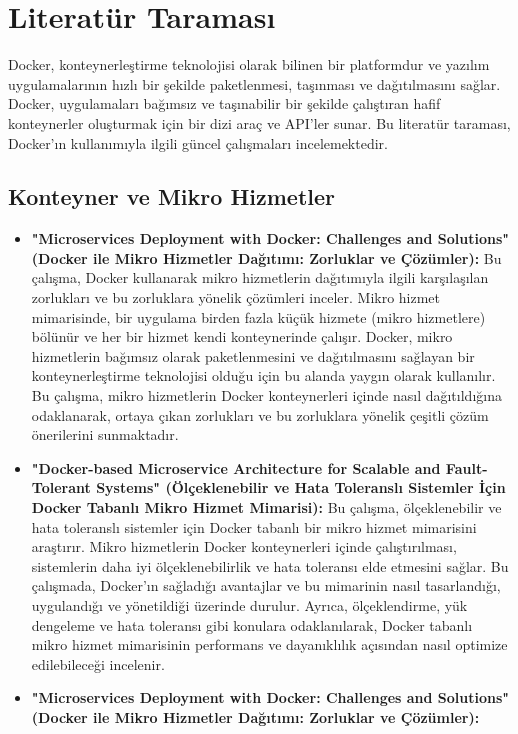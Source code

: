 \section{Literatür Taraması}
Docker, konteynerleştirme teknolojisi olarak bilinen bir platformdur ve yazılım uygulamalarının hızlı bir şekilde paketlenmesi, taşınması ve dağıtılmasını sağlar. Docker, uygulamaları bağımsız ve taşınabilir bir şekilde çalıştıran hafif konteynerler oluşturmak için bir dizi araç ve API'ler sunar. Bu literatür taraması, Docker'ın kullanımıyla ilgili güncel çalışmaları incelemektedir.\\
\subsection{Konteyner ve Mikro Hizmetler}
\begin{itemize}
\item  \textbf{"Microservices Deployment with Docker: Challenges and Solutions" (Docker ile Mikro Hizmetler Dağıtımı: Zorluklar ve Çözümler):}
Bu çalışma, Docker kullanarak mikro hizmetlerin dağıtımıyla ilgili karşılaşılan zorlukları ve bu zorluklara yönelik çözümleri inceler. Mikro hizmet mimarisinde, bir uygulama birden fazla küçük hizmete (mikro hizmetlere) bölünür ve her bir hizmet kendi konteynerinde çalışır. Docker, mikro hizmetlerin bağımsız olarak paketlenmesini ve dağıtılmasını sağlayan bir konteynerleştirme teknolojisi olduğu için bu alanda yaygın olarak kullanılır. Bu çalışma, mikro hizmetlerin Docker konteynerleri içinde nasıl dağıtıldığına odaklanarak, ortaya çıkan zorlukları ve bu zorluklara yönelik çeşitli çözüm önerilerini sunmaktadır.\\
\item \textbf{"Docker-based Microservice Architecture for Scalable and Fault-Tolerant Systems" (Ölçeklenebilir ve Hata Toleranslı Sistemler İçin Docker Tabanlı Mikro Hizmet Mimarisi):}
Bu çalışma, ölçeklenebilir ve hata toleranslı sistemler için Docker tabanlı bir mikro hizmet mimarisini araştırır. Mikro hizmetlerin Docker konteynerleri içinde çalıştırılması, sistemlerin daha iyi ölçeklenebilirlik ve hata toleransı elde etmesini sağlar. Bu çalışmada, Docker'ın sağladığı avantajlar ve bu mimarinin nasıl tasarlandığı, uygulandığı ve yönetildiği üzerinde durulur. Ayrıca, ölçeklendirme, yük dengeleme ve hata toleransı gibi konulara odaklanılarak, Docker tabanlı mikro hizmet mimarisinin performans ve dayanıklılık açısından nasıl optimize edilebileceği incelenir.\\
\item \textbf{"Microservices Deployment with Docker: Challenges and Solutions" (Docker ile Mikro Hizmetler Dağıtımı: Zorluklar ve Çözümler):}

\end{itemize}
